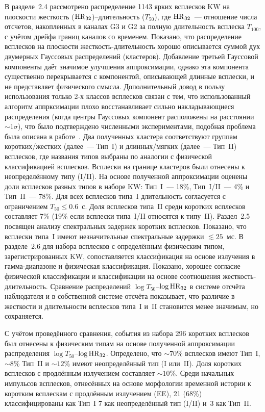В разделе~2.4 рассмотрено распределение 1143 ярких всплесков KW на плоскости 
жесткость (${\mathrm{HR}}_{32}$)--длительность ($T_{50}$),
где ${\mathrm{HR}}_{32}$~--- отношение числа отсчетов, накопленных в каналах G3 и G2 
за полную длительность всплеска $T_{100}$, с учётом дрейфа границ каналов со временем.
Показано, что распределение всплесков на плоскости жесткость-длительность 
хорошо описывается суммой дух двумерных Гауссовых распределений (кластеров).
Добавление третьей Гауссовой компоненты даёт значимое улучшения аппроксимации, однако эта 
компонента существенно перекрывается с компонентой, описывающей длинные всплески, 
и не представляет физического смысла. Дополнительный довод в пользу использования
только 2-х классов всплесков связан с тем, что использованный алгоритм аппрксимации
плохо восстанавливает сильно накладывающиеся распределения 
(когда центры Гауссовых компонент расположены на расстоянии $\sim 1\sigma$),
что было подтверждено численными экспериментами, подобная проблема была
описана в работе~\citep{Igoshev_2013MNRAS}.
Два полученных кластера соответствуют 
группам коротких/жестких (далее~--- Тип~I) и длинных/мягких (далее~--- Тип~II) всплесков,
где названия типов выбраны по аналогии с физической классификацией всплесков.
Всплески на границе кластеров были отнесены к неопределённому типу (I/II).
На основе полученной аппроксимации оценены доли всплесков разных 
типов в наборе KW: Тип~I~--- 18\%, Тип~I/II~--- 4\% и Тип~II~--- 78\%. 
Для всех всплесков типа~I длительность согласуется 
с ограничением $T_{50} \leq 0.6$~с. Доля всплесков типа~II среди коротких всплесков 
составляет 7\% (19\% если всплески типа~I/II относятся к типу~II).
Раздел~2.5 посвящен анализу спектральных задержек коротких всплесков. 
Показано, что всплески типа~I имеют незначительные спектральные задержки $\lesssim 25$~мс.
В разделе~2.6 для набора всплесков с определённым физическим типом, 
зарегистрированных KW, сопоставляется классификация на основе излучения 
в гамма-диапазоне и физическая классификация. Показано, хорошее согласие физической классификации 
и классификации на основе соотношения жесткость-длительность.
Сравнение распределений $\log T_{50}$--$\log {\mathrm{HR}}_{32}$ в системе отсчёта наблюдателя 
и в собственной системе отсчёта показывает, что различие в жесткости и длительности
всплесков типа~I и~II становится менее значимым, но сохраняется.

С учётом проведённого сравнения, события из набора 296 коротких всплесков 
был отнесены к физическим типам на основе полученной аппроксимации 
распределения $\log T_{50}$--$\log {\mathrm{HR}}_{32}$. 
Определено, что $\sim 70$\% всплесков имеют Тип~I, 
$\sim 8$\% Тип~II и $\sim 12$\% имеют неопределённый тип (I или~II). 
Доля коротких всплесков с продлённым излучением составляет $\sim 10$\%.
Среди начальных импульсов всплесков, отнесённых на основе морфологии временной 
истории к коротким всплескам с продлённым излучением (EE), 21 (68\%) классифицированы как Тип~I 
7 как неопределённый тип (I/II) и~3 как Тип~II.

